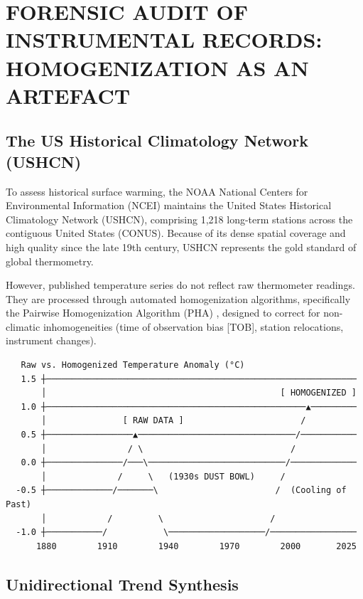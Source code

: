 \documentclass[10pt,twocolumn]{article}
\begin{document}
\section{FORENSIC AUDIT OF INSTRUMENTAL RECORDS: HOMOGENIZATION AS AN ARTEFACT}


\subsection{The US Historical Climatology Network (USHCN)}

To assess historical surface warming, the NOAA National Centers for Environmental Information (NCEI) maintains the United States Historical Climatology Network (USHCN), comprising 1,218 long-term stations across the contiguous United States (CONUS). Because of its dense spatial coverage and high quality since the late 19th century, USHCN represents the gold standard of global thermometry.

However, published temperature series do not reflect raw thermometer readings. They are processed through automated homogenization algorithms, specifically the Pairwise Homogenization Algorithm (PHA) \cite{MenneWilliams2009}, designed to correct for non-climatic inhomogeneities (time of observation bias [TOB], station relocations, instrument changes).

\begin{verbatim}
   Raw vs. Homogenized Temperature Anomaly (°C)
   1.5 ┼─────────────────────────────────────────────────────────────
       │                                              [ HOMOGENIZED ]
   1.0 ┼───────────────────────────────────────────────────▲─────────
       │               [ RAW DATA ]                       /
   0.5 ┼─────────────────▲───────────────────────────────/───────────
       │                / \                             /
   0.0 ┼───────────────/───\───────────────────────────/─────────────
       │              /     \   (1930s DUST BOWL)     /
  -0.5 ┼─────────────/───────\                       /  (Cooling of Past)
       │            /         \                     /
  -1.0 ┼───────────/           \───────────────────/─────────────────
      1880        1910        1940        1970        2000       2025
\end{verbatim}


\subsection{Unidirectional Trend Synthesis}
\end{document}
